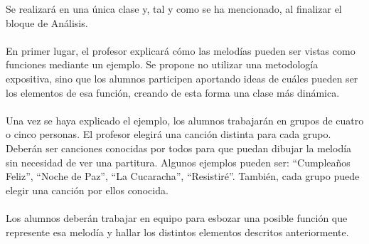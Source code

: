 \documentclass[a4paper, openright, 11pt, titlepage]{report}
\theoremstyle{definition}\newtheorem{defin}[propo]{Definition}
\theoremstyle{definition}\newtheorem{obser}[propo]{Remark}
\theoremstyle{definition}\newtheorem{ejem}[propo]{Ejemplo}
\theoremstyle{definition}\newtheorem{algoritmo}[propo]{Algoritmo}
\begin{document}
Se realizará en una única clase y, tal y como se ha mencionado, al finalizar el bloque de Análisis.\\\\
En primer lugar, el profesor explicará cómo las melodías pueden ser vistas como funciones mediante un ejemplo. Se propone no utilizar una metodología expositiva, sino que los alumnos participen aportando ideas de cuáles pueden ser los elementos de esa función, creando de esta forma una clase más dinámica.\\\\
Una vez se haya explicado el ejemplo, los alumnos trabajarán en grupos de cuatro o cinco personas. El profesor elegirá una canción distinta para cada grupo. Deberán ser canciones conocidas por todos para que puedan dibujar la melodía sin necesidad de ver una partitura. Algunos ejemplos pueden ser: ``Cumpleaños Feliz'', ``Noche de Paz'', ``La Cucaracha'', ``Resistiré''. También, cada grupo puede elegir una canción por ellos conocida.\\\\
Los alumnos deberán trabajar en equipo para esbozar una posible función que represente esa melodía y hallar los distintos elementos descritos anteriormente. 
\end{document}
